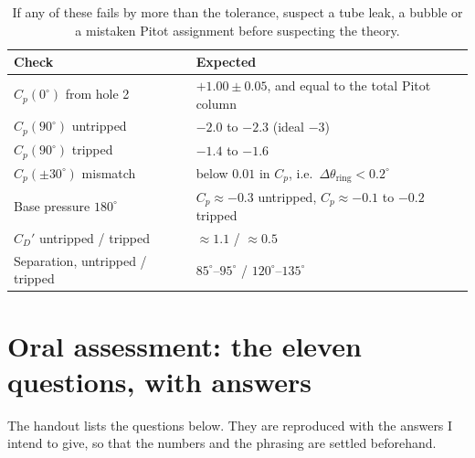 \documentclass[11pt,a4paper]{article}
\newcommand{\Cp}{\ensuremath{C_p}}
\newcommand{\CD}{\ensuremath{C_D}}
\begin{document}
\begin{table}[H]
\centering\small
\begin{tabularx}{\textwidth}{@{}lX@{}}
\toprule
Check & Expected \\
\midrule
$\Cp(0^\circ)$ from hole 2 & $+1.00 \pm 0.05$, and equal to the total Pitot column \\
$\Cp(90^\circ)$ untripped & $-2.0$ to $-2.3$ (ideal $-3$) \\
$\Cp(90^\circ)$ tripped & $-1.4$ to $-1.6$ \\
$\Cp(\pm30^\circ)$ mismatch & below $0.01$ in $\Cp$, i.e.\ $\Delta\theta_{\text{ring}} < 0.2^\circ$ \\
Base pressure $180^\circ$ & $\Cp \approx -0.3$ untripped, $\Cp \approx -0.1$ to $-0.2$ tripped \\
$\CD'$ untripped / tripped & $\approx 1.1$ / $\approx 0.5$ \\
Separation, untripped / tripped & $85^\circ$--$95^\circ$ / $120^\circ$--$135^\circ$ \\
\bottomrule
\end{tabularx}
\caption{If any of these fails by more than the tolerance, suspect a tube leak, a bubble or a
mistaken Pitot assignment before suspecting the theory.}
\end{table}

\section{Oral assessment: the eleven questions, with answers}\label{sec:oral}

The handout lists the questions below. They are reproduced with the answers I intend to give,
so that the numbers and the phrasing are settled beforehand.
\end{document}

